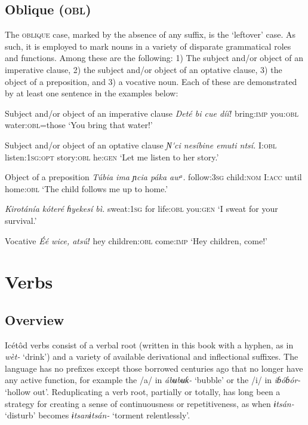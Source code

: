 \subsection{Oblique (\textsc{obl})}


The \textsc{oblique} case, marked by the absence of any suffix, is the ‘leftover’ case. As such, it is employed to mark nouns in a variety of disparate grammatical roles and functions. Among these are the following: 1) The subject and/or object of an imperative clause, 2) the subject and/or object of an optative clause, 3) the object of a preposition, and 3) a vocative noun. Each of these are demonstrated by at least one sentence in the examples below:




Subject and/or object of an imperative clause
\textit{Deté     bi     cue dííǃ}
bring:\textsc{imp}   you:\textsc{obl}   water:\textsc{obl}=those
‘You bring that water!’

Subject and/or object of an optative clause
\textit{Ɲ}\textit{\'{ }ci   nesíbine     emuti     ntsí.}
I:\textsc{obl}   listen:\textsc{1sg:opt}   story:\textsc{obl}   he:\textsc{gen}
‘Let me listen to her story.’




Object of a preposition
\textit{Túbia     ima     ɲcia   páka   awᵃ.}
follow:\textsc{3sg}   child:\textsc{nom}   I:\textsc{acc}   until   home:\textsc{obl}
‘The child follows me up to home.’




\textit{Kirotánía  kóteré   ɦyekesí   bì.}
sweat:\textsc{1sg}   for     life:\textsc{obl}   you:\textsc{gen}
‘I sweat for your survival.’





Vocative
\textit{\'{E}é   wice,     atsúǃ}
hey   children:\textsc{obl}  come:\textsc{imp}
‘Hey children, come!’




\section{Verbs}



\subsection{Overview}


Icétôd verbs consist of a verbal root (written in this book with a hyphen, as in \textit{wèt- }‘drink’) and a variety of available derivational and inflectional suffixes. The language has no prefixes except those borrowed centuries ago that no longer have any active function, for example the /a/ in \textit{ábʉbʉƙ- }‘bubble’ or the /i/ in \textit{iɓóɓór- }‘hollow out’. Reduplicating a verb root, partially or totally, has long been a strategy for creating a sense of continuousness or repetitiveness, as when \textit{ɨtsán- }‘disturb’ becomes \textit{ɨtsanɨtsán- }‘torment relentlessly’. 

